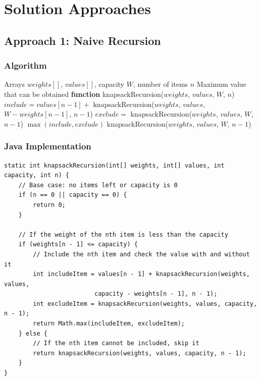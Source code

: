 \documentclass[12pt,a4paper]{article}
\begin{document}
\section{Solution Approaches}

\subsection{Approach 1: Naive Recursion}

\subsubsection{Algorithm}
\begin{algorithm}
\caption{0-1 Knapsack - Recursive Approach}
\begin{algorithmic}
\REQUIRE Arrays $weights[]$, $values[]$, capacity $W$, number of items $n$
\ENSURE Maximum value that can be obtained
\STATE \textbf{function} knapsackRecursion($weights$, $values$, $W$, $n$)
\ENDIF
{}
    \STATE $include = values[n-1] + $ knapsackRecursion($weights$, $values$, $W - weights[n-1]$, $n-1$)
    \STATE $exclude = $ knapsackRecursion($weights$, $values$, $W$, $n-1$)
    \RETURN $\max(include, exclude)$
\ELSE
    \RETURN knapsackRecursion($weights$, $values$, $W$, $n-1$)
\ENDIF
\end{algorithmic}
\end{algorithm}

\subsubsection{Java Implementation}
\begin{lstlisting}[caption=Naive Recursive Solution]
static int knapsackRecursion(int[] weights, int[] values, int capacity, int n) {
    // Base case: no items left or capacity is 0
    if (n == 0 || capacity == 0) {
        return 0;
    }
    
    // If the weight of the nth item is less than the capacity 
    if (weights[n - 1] <= capacity) {
        // Include the nth item and check the value with and without it
        int includeItem = values[n - 1] + knapsackRecursion(weights, values, 
                         capacity - weights[n - 1], n - 1);
        int excludeItem = knapsackRecursion(weights, values, capacity, n - 1);
        return Math.max(includeItem, excludeItem);
    } else {
        // If the nth item cannot be included, skip it
        return knapsackRecursion(weights, values, capacity, n - 1);
    }
}
\end{lstlisting}
\end{document}
